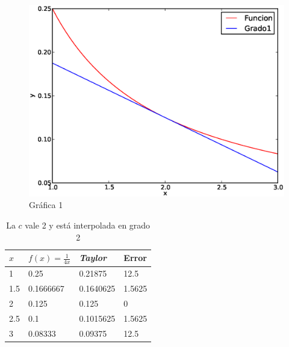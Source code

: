 \documentclass[a4paper,12pt]{article}
\begin{document}
\begin{figure}[ht]
  \begin{center}
    \includegraphics[scale=.6]{segunda.eps}
    \caption{Gráfica 1} 
   
  \end{center}
\end{figure}

\newpage

\begin{table}[!hbt]
\begin{center}
\begin{tabular}[c]{||l | l ||l|l||}
\hline
\hline
$x$  & $f(x)=\frac{1}{4x}$ &{\em Taylor} & Error \\
\hline
1 &0.25 & 0.21875 &12.5 \\
\hline
1.5 &0.1666667  & 0.1640625& 1.5625  \\
\hline
2 &0.125 &0.125 &  0 \\
\hline
2.5 &0.1 &0.1015625 & 1.5625  \\
\hline
3 &  0.08333 &  0.09375& 12.5  \\
\hline
\hline
\end{tabular}
\caption{La $c$ vale 2 y está interpolada en grado 2}
\end{center}
\end{table}
\end{document}

